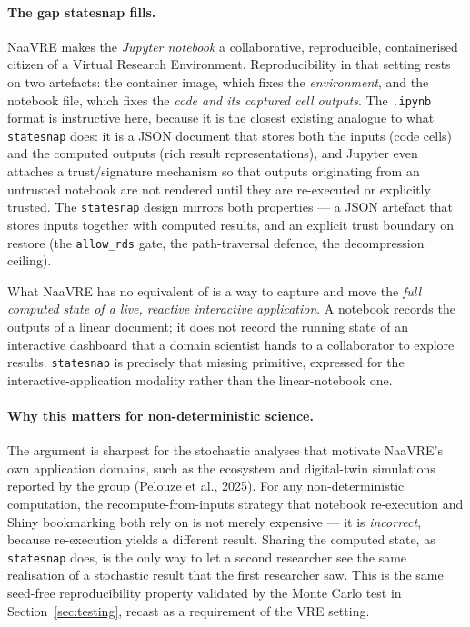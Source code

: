 \documentclass[11pt,a4paper]{article}
\begin{document}
\paragraph{The gap statesnap fills.}
NaaVRE makes the \emph{Jupyter notebook} a collaborative, reproducible,
containerised citizen of a Virtual Research Environment. Reproducibility in that
setting rests on two artefacts: the container image, which fixes the
\emph{environment}, and the notebook file, which fixes the \emph{code and its
captured cell outputs}. The \texttt{.ipynb} format is instructive here, because
it is the closest existing analogue to what \texttt{statesnap} does: it is a JSON
document that stores both the inputs (code cells) and the computed outputs
(rich result representations), and Jupyter even attaches a trust/signature
mechanism so that outputs originating from an untrusted notebook are not rendered
until they are re-executed or explicitly trusted. The \texttt{statesnap} design
mirrors both properties --- a JSON artefact that stores inputs together with
computed results, and an explicit trust boundary on restore (the
\texttt{allow\_rds} gate, the path-traversal defence, the decompression ceiling).

What NaaVRE has no equivalent of is a way to capture and move the \emph{full
computed state of a live, reactive interactive application}. A notebook records
the outputs of a linear document; it does not record the running state of an
interactive dashboard that a domain scientist hands to a collaborator to explore
results. \texttt{statesnap} is precisely that missing primitive, expressed for
the interactive-application modality rather than the linear-notebook one.

\paragraph{Why this matters for non-deterministic science.}
The argument is sharpest for the stochastic analyses that motivate NaaVRE's
own application domains, such as the ecosystem and digital-twin simulations
reported by the group (Pelouze et al., 2025). For any non-deterministic
computation, the recompute-from-inputs strategy that notebook re-execution and
Shiny bookmarking both rely on is not merely expensive --- it is
\emph{incorrect}, because re-execution yields a different result. Sharing the
computed state, as \texttt{statesnap} does, is the only way to let a second
researcher see the same realisation of a stochastic result that the first
researcher saw. This is the same seed-free reproducibility property validated by
the Monte Carlo test in Section~\ref{sec:testing}, recast as a requirement of the
VRE setting.
\end{document}
